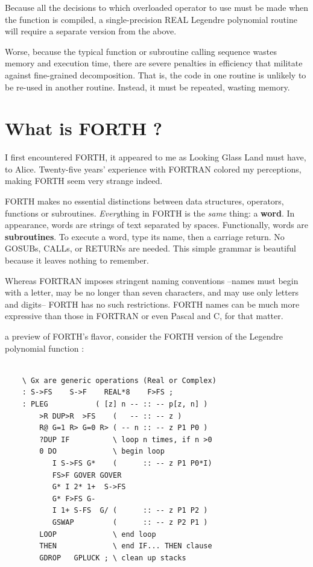 Because all the decisions to which overloaded operator to use must be made when the function is compiled, a single-precision REAL Legendre polynomial routine will require a separate version from the above.

Worse, because the typical function or subroutine calling sequence wastes memory and execution time, there are severe penalties in efficiency that militate against fine-grained decomposition. That is, the code in one routine is unlikely to be re-used in another routine. Instead, it must be repeated, wasting memory. 

\section{What is FORTH ?}
 I first encountered FORTH, it appeared to me as Looking Glass Land must have, to Alice. Twenty-five years' experience with FORTRAN colored my perceptions, making FORTH seem very strange indeed.

FORTH makes no essential distinctions between data structures, operators, functions or subroutines. \textit{Every}thing in FORTH is the \textit{same} thing: a \textbf{word}. In appearance, words are strings of text separated by spaces. Functionally, words are \textbf{subroutines}. To execute a word, type its name, then a carriage return. No GOSUBs, CALLs, or RETURNs are needed. This simple grammar is beautiful because it leaves nothing to remember.

Whereas FORTRAN imposes stringent naming conventions --names must begin with a letter, may be no longer than seven characters, and may use only letters and digits-- FORTH has no such restrictions. FORTH names can be much more expressive than those in FORTRAN or even Pascal and C, for that matter.

 a preview of FORTH's flavor, consider the FORTH version of the Legendre polynomial function :

\begin{lstlisting}

    \ Gx are generic operations (Real or Complex)
    : S->FS    S->F    REAL*8    F>FS ;
    : PLEG           ( [z] n -- :: -- p[z, n] )
        >R DUP>R  >FS    (   -- :: -- z )
        R@ G=1 R> G=0 R> ( -- n :: -- z P1 P0 )
        ?DUP IF          \ loop n times, if n >0
        0 DO             \ begin loop
           I S->FS G*    (      :: -- z P1 P0*I)
           FS>F GOVER GOVER
           G* I 2* 1+  S->FS
           G* F>FS G-
           I 1+ S-FS  G/ (      :: -- z P1 P2 )
           GSWAP         (      :: -- z P2 P1 )
        LOOP             \ end loop
        THEN             \ end IF... THEN clause
        GDROP   GPLUCK ; \ clean up stacks
\end{lstlisting}

